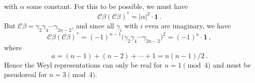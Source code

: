 with \(\alpha\) some constant. For this to be possible, we must have
\begin{equation}
  \mathcal C\beta(\mathcal C\beta)^*
  =|\alpha|^2\mathbin{\cdot}\mathbf{1}\,.
  \tag{32.A.27}\label{eq:32.A.27}
\end{equation}
But \(\mathcal C\beta=\gamma_2\gamma_4\cdots\gamma_{2n-2}\), and since all
\(\gamma_i\) with \(i\) even are imaginary, we have
\begin{equation}
  \mathcal C\beta(\mathcal C\beta)^*
  =(-1)^{n-1}\bigl(\gamma_2\gamma_4\cdots\gamma_{2n-2}\bigr)^2
  =(-1)^a\mathbin{\cdot}\mathbf{1}\,,
  \tag{32.A.28}\label{eq:32.A.28}
\end{equation}
where
\begin{equation}
  a=(n-1)+(n-2)+\cdots+1=n(n-1)/2\,.
  \tag{32.A.29}\label{eq:32.A.29}
\end{equation}
Hence the Weyl representations can only be real for \(n=1\pmod 4\) and
must be pseudoreal for \(n=3\pmod 4\).

